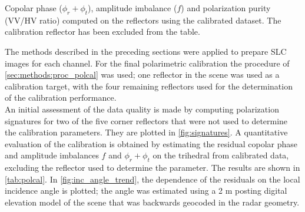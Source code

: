 				
\begin{table}[ht!]
	\centering
	\caption{Copolar phase ($\phi_r + \phi_t$), amplitude imbalance ($f$)  and polarization purity (VV/HV ratio) computed on the reflectors using the calibrated dataset. The calibration reflector has been excluded from the table.}
	\label{tab:polcal}
\end{table}		
The methods described in the preceding sections were applied to prepare SLC images for each channel. For the final polarimetric calibration the procedure of \autoref{sec:methods:proc_polcal} was used; one reflector in the scene was used as a calibration target, with the four remaining reflectors used for the determination of the calibration performance.\\
An initial assessment of the data quality is made  by computing polarization signatures\cite{VanZyl1987} for two of the five corner reflectors that were not used to determine the calibration parameters. They are plotted in \autoref{fig:signatures}. A quantitative evaluation of the calibration is obtained by estimating the residual copolar phase and amplitude imbalances $f$ and $\phi_r + \phi_t$ on the trihedral from calibrated data, excluding the reflector used to determine the parameter. The results are shown in \autoref{tab:polcal}.
In \autoref{fig:inc_angle_trend}, the dependence of the residuals on the local incidence angle is plotted; the angle was estimated using a 2 m posting digital elevation model of the scene that was backwards geocoded in the radar geometry.